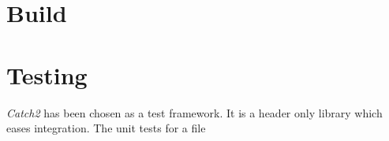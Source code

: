 \section{Build}

\section{Testing}

\emph{Catch2} has been chosen as a test framework. It is a header only library which eases integration. The unit tests for a file  

